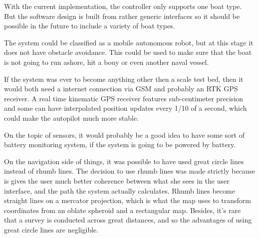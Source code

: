 With the current implementation, the controller only supports one boat type. But the software design is built from rather generic interfaces so it should be possible in the future to include a variety of boat types.

The system could be classified as a mobile autonomous robot, but at this stage it does not have obstacle avoidance. This could be used to make sure that the boat is not going to run ashore, hit a bouy or even another naval vessel. 

If the system was ever to become anything other then a scale test bed, then it would both need a internet connection via GSM and probably an RTK GPS receiver. A real time kinematic GPS receiver features sub-centimeter precision and some can have interpolated position updates every 1/10 of a second, which could make the autopilot much more stable.

On the topic of sensors, it would probably be a good idea to have some sort of battery monitoring system, if the system is going to be powered by battery. 

On the navigation side of things, it was possible to have used great circle lines instead of rhumb lines. The decision to use rhumb lines was made strictly because is gives the user much better coherence between what she sees in the user interface, and the path the system actually calculates. Rhumb lines become straight lines on a mercator projection, which is what the map uses to transform coordinates from an oblate spheroid and a rectangular map. Besides, it's rare that a survey is conducted across great distances, and so the advantages of using great circle lines are negligible.

